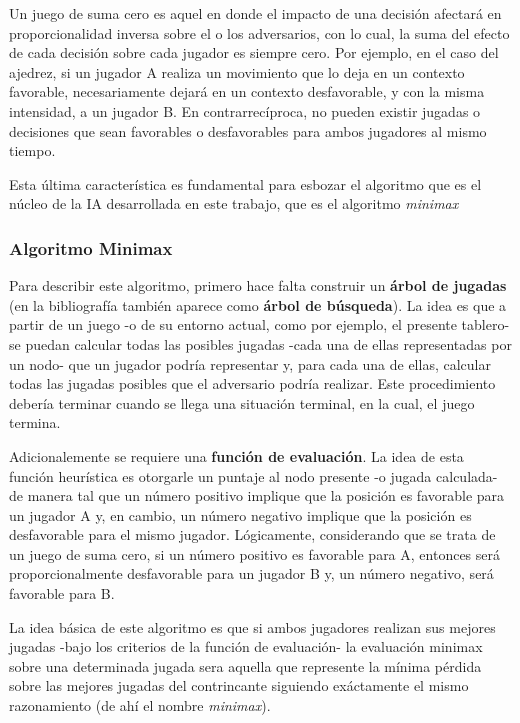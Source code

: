 \documentclass{llncs}
\begin{document}
Un juego de suma cero es aquel en donde el impacto de una decisión afectará en proporcionalidad inversa sobre el o los adversarios, con lo cual, la suma del efecto de cada decisión sobre cada jugador es siempre cero. Por ejemplo, en el caso del ajedrez, si un jugador A realiza un movimiento que lo deja en un contexto favorable, necesariamente dejará en un contexto desfavorable, y con la misma intensidad, a un jugador B. En contrarrecíproca, no pueden existir jugadas o decisiones que sean favorables o desfavorables para ambos jugadores al mismo tiempo.

Esta última característica es fundamental para esbozar el algoritmo que es el núcleo de la IA desarrollada en este trabajo, que es el algoritmo \textit{minimax}

\subsubsection{ Algoritmo Minimax }

Para describir este algoritmo, primero hace falta construir un \textbf{árbol de jugadas} (en la bibliografía también aparece como \textbf{árbol de búsqueda}). La idea es que a partir de un juego -o de su entorno actual, como por ejemplo, el presente tablero- se puedan calcular todas las posibles jugadas -cada una de ellas representadas por un nodo- que un jugador podría representar y, para cada una de ellas, calcular todas las jugadas posibles que el adversario podría realizar. Este procedimiento debería terminar cuando se llega una situación terminal, en la cual, el juego termina.

Adicionalemente se requiere una \textbf{función de evaluación}. La idea de esta función heurística es otorgarle un puntaje al nodo presente -o jugada calculada- de manera tal que un número positivo implique que la posición es favorable para un jugador A y, en cambio, un número negativo implique que la posición es desfavorable para el mismo jugador. Lógicamente, considerando que se trata de un juego de suma cero, si un número positivo es favorable para A, entonces será proporcionalmente desfavorable para un jugador B y, un número negativo, será favorable para B.

La idea básica de este algoritmo es que si ambos jugadores realizan sus mejores jugadas -bajo los criterios de la función de evaluación- la evaluación minimax sobre una determinada jugada sera aquella que represente la mínima pérdida sobre las mejores jugadas del contrincante siguiendo exáctamente el mismo razonamiento (de ahí el nombre \textit{minimax}).
\end{document}
